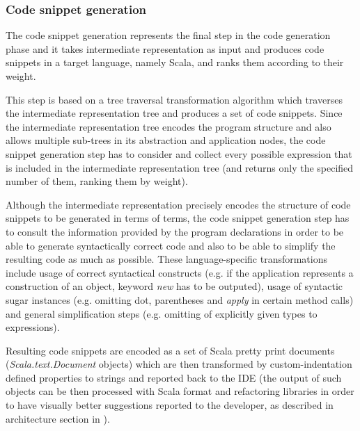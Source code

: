 
\subsubsection{Code snippet generation}

The code snippet generation represents the final step in the code generation phase and it takes intermediate representation as input and produces code snippets in a target language, namely Scala, and ranks them according to their weight.

This step is based on a tree traversal transformation algorithm which traverses the intermediate representation tree and produces a set of code snippets.
Since the intermediate representation tree encodes the program structure and also allows multiple sub-trees in its abstraction and application nodes, the code snippet generation step has to consider and collect every possible expression that is included in the intermediate representation tree (and returns only the specified number of them, ranking them by weight).

Although the intermediate representation precisely encodes the structure of code snippets to be generated in terms of \LC terms, the code snippet generation step has to consult the information provided by the program declarations in order to be able to generate syntactically correct code and also to be able to simplify the resulting code as much as possible.
These language-specific transformations include usage of correct syntactical constructs (e.g. if the application represents a construction of an object, keyword \textit{new} has to be outputed), usage of syntactic sugar instances (e.g. omitting dot, parentheses and \textit{apply} in certain method calls) and general simplification steps (e.g. omitting of explicitly given types to expressions).

Resulting code snippets are encoded as a set of Scala pretty print documents (\textit{Scala.text.Document} objects) which are then transformed by custom-indentation defined properties to strings and reported back to the IDE (the output of such objects can be then processed with Scala format and refactoring libraries in order to have visually better suggestions reported to the developer, as described in architecture section in \cite{scala_dev}).
